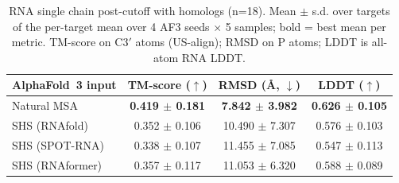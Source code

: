 \begin{table}[htbp]
\centering
\caption{RNA single chain post-cutoff with homologs (n=18). Mean $\pm$ s.d. over targets of the per-target mean over 4 AF3 seeds $\times$ 5 samples; bold = best mean per metric. TM-score on C3$'$ atoms (US-align); RMSD on P atoms; LDDT is all-atom RNA LDDT.}
\label{tab:rna_single_chain_post_cutoff_with_homologs}
\begin{tabular}{lccc}
\toprule
AlphaFold~3 input & TM-score ($\uparrow$) & RMSD (\AA, $\downarrow$) & LDDT ($\uparrow$) \\
\midrule
Natural MSA & \textbf{0.419 $\pm$ 0.181} & \textbf{7.842 $\pm$ 3.982} & \textbf{0.626 $\pm$ 0.105} \\
SHS (RNAfold) & 0.352 $\pm$ 0.106 & 10.490 $\pm$ 7.307 & 0.576 $\pm$ 0.103 \\
SHS (SPOT-RNA) & 0.338 $\pm$ 0.107 & 11.455 $\pm$ 7.085 & 0.547 $\pm$ 0.113 \\
SHS (RNAformer) & 0.357 $\pm$ 0.117 & 11.053 $\pm$ 6.320 & 0.588 $\pm$ 0.089 \\
\bottomrule
\end{tabular}
\end{table}

\begin{table}[htbp]
\centering
\caption{RNA-protein complexes (n=377). Mean $\pm$ s.d. over targets of the per-target mean over 4 AF3 seeds $\times$ 5 samples; bold = best mean per metric. DockQ, ICS and QS-global score the RNA-protein interface; cTM is the complex TM-score; cRMSD over all polymer atoms after superposition, before outlier rejection; cLDDT is all-atom complex LDDT.}
\label{tab:rna_protein_complexes}
\end{table}

